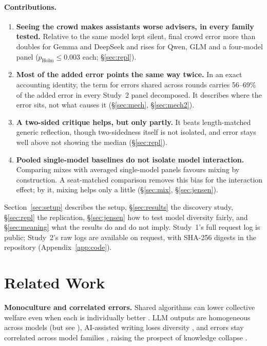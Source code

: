 \documentclass[10pt]{article}
\theoremstyle{manuscript}\newtheorem{proposition}{Proposition}
\newcommand{\pH}{p_{\text{Holm}}}
\begin{document}
\paragraph{Contributions.}
\begin{enumerate}[leftmargin=*]
\item \textbf{Seeing the crowd makes assistants worse advisers, in every family tested.} Relative to the same model kept silent, final crowd error more than doubles for Gemma and DeepSeek and rises for Qwen, GLM and a four-model panel ($\pH\le0.003$ each; \S\ref{sec:repl}).
\item \textbf{Most of the added error points the same way twice.} In an exact accounting identity, the term for errors shared across rounds carries 56--69\% of the added error in every Study~2 panel decomposed. It describes where the error sits, not what causes it (\S\ref{sec:mech}, \S\ref{sec:mech2}).
\item \textbf{A two-sided critique helps, but only partly.} It beats length-matched generic reflection, though two-sidedness itself is not isolated, and error stays well above not showing the median (\S\ref{sec:repl}).
\item \textbf{Pooled single-model baselines do not isolate model interaction.} Comparing mixes with averaged single-model panels favours mixing by construction. A seat-matched comparison removes this bias for the interaction effect; by it, mixing helps only a little (\S\ref{sec:mix}, \S\ref{sec:jensen}).
\end{enumerate}

\smallskip\noindent Section~\ref{sec:setup} describes the setup, \S\ref{sec:results} the discovery study, \S\ref{sec:repl} the replication, \S\ref{sec:jensen} how to test model diversity fairly, and \S\ref{sec:meaning} what the results do and do not imply. Study~1's full request log is public; Study~2's raw logs are available on request, with SHA-256 digests in the repository (Appendix~\ref{app:code}).

\section{Related Work}
\textbf{Monoculture and correlated errors.} Shared algorithms can lower collective welfare even when each is individually better \citep{kleinberg2021}. LLM outputs are homogeneous across models \citep{jiang2025,qiu2026} (but see \citep{schaeffer2026}), AI-assisted writing loses diversity \citep{padmakumar2024,sourati2026}, and errors stay correlated across model families \citep{kim2025corr}, raising the prospect of knowledge collapse \citep{peterson2024}.
\end{document}
